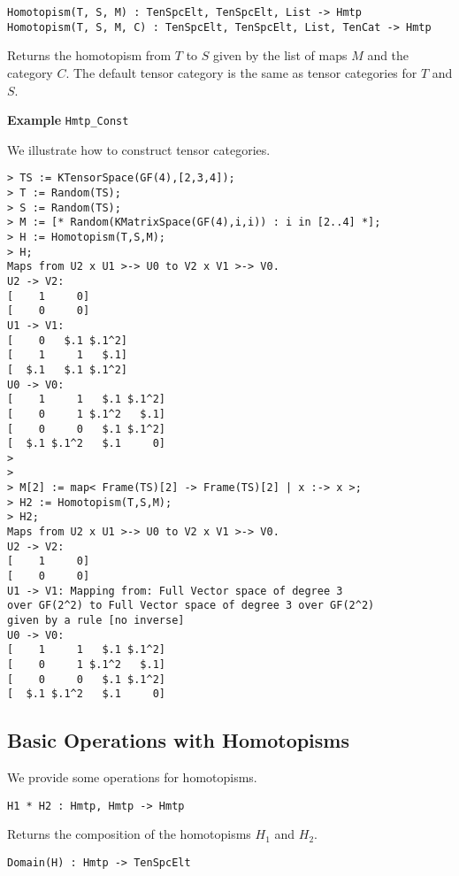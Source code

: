 \color{blue}
{\small \begin{verbatim}
Homotopism(T, S, M) : TenSpcElt, TenSpcElt, List -> Hmtp
Homotopism(T, S, M, C) : TenSpcElt, TenSpcElt, List, TenCat -> Hmtp
\end{verbatim} }
\color{black}

Returns the homotopism from $T$ to $S$ given by the list of maps $M$ and the category $C$. 
The default tensor category is the same as tensor categories for $T$ and $S$.

\begin{framed}{\bf Example} {\tt Hmtp\_Const}\\
{\small We illustrate how to construct tensor categories.
\begin{lstlisting}[frame=single,basicstyle=\ttfamily\color{black!30!
teal},backgroundcolor=\color{white!70!gray}]
> TS := KTensorSpace(GF(4),[2,3,4]);
> T := Random(TS);
> S := Random(TS);
> M := [* Random(KMatrixSpace(GF(4),i,i)) : i in [2..4] *];
> H := Homotopism(T,S,M);
> H;
Maps from U2 x U1 >-> U0 to V2 x V1 >-> V0.
U2 -> V2: 
[    1     0]
[    0     0]
U1 -> V1: 
[    0   $.1 $.1^2]
[    1     1   $.1]
[  $.1   $.1 $.1^2]
U0 -> V0: 
[    1     1   $.1 $.1^2]
[    0     1 $.1^2   $.1]
[    0     0   $.1 $.1^2]
[  $.1 $.1^2   $.1     0]
> 
> 
> M[2] := map< Frame(TS)[2] -> Frame(TS)[2] | x :-> x >;
> H2 := Homotopism(T,S,M);
> H2;
Maps from U2 x U1 >-> U0 to V2 x V1 >-> V0.
U2 -> V2: 
[    1     0]
[    0     0]
U1 -> V1: Mapping from: Full Vector space of degree 3 
over GF(2^2) to Full Vector space of degree 3 over GF(2^2) 
given by a rule [no inverse]
U0 -> V0: 
[    1     1   $.1 $.1^2]
[    0     1 $.1^2   $.1]
[    0     0   $.1 $.1^2]
[  $.1 $.1^2   $.1     0]
\end{lstlisting} }
\end{framed}


\subsection{Basic Operations with Homotopisms}

We provide some operations for homotopisms.

\color{blue}
{\small \begin{verbatim}
H1 * H2 : Hmtp, Hmtp -> Hmtp
\end{verbatim} }
\color{black}

Returns the composition of the homotopisms $H_1$ and $H_2$.

\color{blue}
{\small \begin{verbatim}
Domain(H) : Hmtp -> TenSpcElt
\end{verbatim} }
\color{black}

